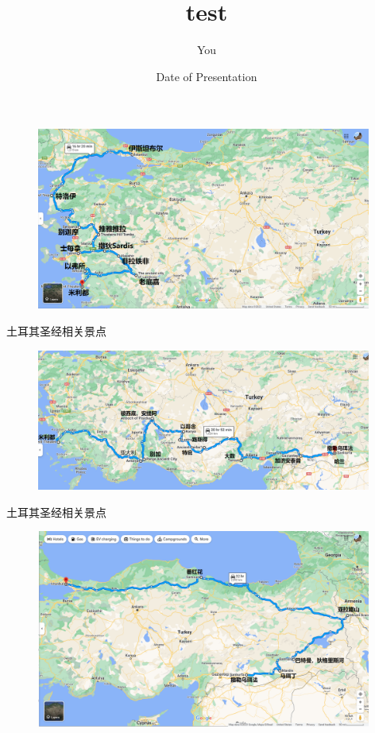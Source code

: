 \documentclass{beamer}
\title[Your Short Title]{test}
\author{You}
\institute{Where You're From}
\date{Date of Presentation}
\begin{document}
\begin{frame}{}
\begin{figure}
\includegraphics[width=11cm]{Turkey1}
\end{figure}
\end{frame}





\begin{frame}{土耳其圣经相关景点}
\begin{figure}
\includegraphics[width=11cm]{Turkey3}
\end{figure}
\end{frame}

\begin{frame}{土耳其圣经相关景点}
\begin{figure}
\includegraphics[width=11cm]{Tuerqi3}
\end{figure}
\end{frame}
\end{document}
